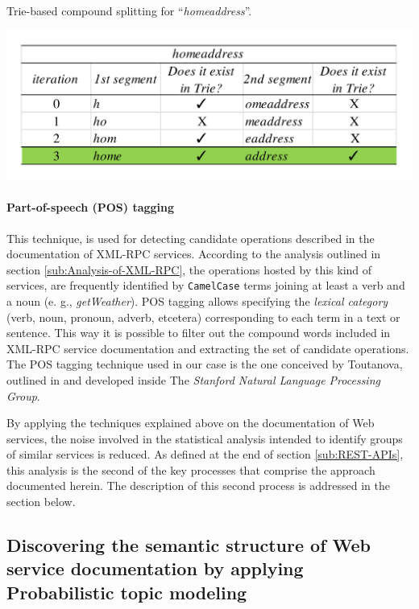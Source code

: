 \begin{table}
\caption{Trie-based compound splitting for \textquotedblleft{}\emph{homeaddress}\textquotedblright{}.}


\center\includegraphics[scale=0.5]{images/example-trie-spellchecking-en}\label{trie-example}
\end{table}



\paragraph{Part-of-speech (POS) tagging}
\label{parag:part-of-speech}
This technique, is used for detecting candidate operations described in the documentation of XML-RPC services. According to the analysis outlined in section \ref{sub:Analysis-of-XML-RPC}, the operations hosted by this kind of services, are frequently identified by \texttt{CamelCase} terms joining at least a verb and a noun (e. g., \emph{getWeather}). POS tagging allows specifying the \emph{lexical category} (verb, noun, pronoun, adverb, etcetera) corresponding to each term in a text or sentence. This way it is possible to filter out the compound words included in XML-RPC service documentation and extracting the set of candidate operations. The POS tagging technique used in our case is the one conceived by Toutanova, outlined in \cite{Toutanova:2003} and developed inside The \emph{Stanford Natural Language Processing Group}.

By applying the techniques explained above on the documentation of Web services, the noise involved in the statistical analysis intended
to identify groups of similar services is reduced. As defined at the end of section \ref{sub:REST-APIs}, this analysis is the second of the key processes that comprise the approach documented herein. The description of this second process is addressed in the section below.

\subsection{Discovering the semantic structure of Web service documentation by applying Probabilistic topic modeling}
\label{subsec:probabilistic-topic-models}

